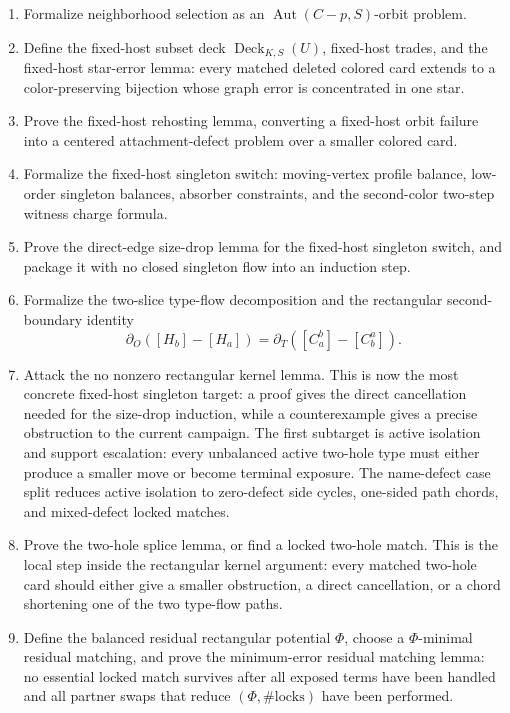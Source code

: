 \documentclass[11pt]{article}
\newcommand{\Deck}{\operatorname{Deck}}
\newcommand{\Aut}{\operatorname{Aut}}
\begin{document}
\begin{enumerate}[leftmargin=2em]
  \item Formalize neighborhood selection as an \(\Aut(C-p,S)\)-orbit problem.

  \item Define the fixed-host subset deck
  \(\Deck_{K,S}(U)\), fixed-host trades, and the fixed-host star-error
  lemma: every matched deleted colored card extends to a color-preserving
  bijection whose graph error is concentrated in one star.

  \item Prove the fixed-host rehosting lemma, converting a fixed-host orbit
  failure into a centered attachment-defect problem over a smaller colored
  card.

  \item Formalize the fixed-host singleton switch: moving-vertex profile
  balance, low-order singleton balances, absorber constraints, and the
  second-color two-step witness charge formula.

  \item Prove the direct-edge size-drop lemma for the fixed-host singleton
  switch, and package it with no closed singleton flow into an induction step.

  \item Formalize the two-slice type-flow decomposition and the rectangular
  second-boundary identity
  \[
    \partial_O([H_b]-[H_a])
    =
    \partial_T([C_a^b]-[C_b^a]).
  \]

  \item Attack the no nonzero rectangular kernel lemma.  This is now the
  most concrete fixed-host singleton target: a proof gives the direct
  cancellation needed for the size-drop induction, while a counterexample
  gives a precise obstruction to the current campaign.  The first subtarget is
  active isolation and support escalation: every unbalanced active two-hole
  type must either produce a smaller move or become terminal exposure.  The
  name-defect case split reduces active isolation to zero-defect side cycles,
  one-sided path chords, and mixed-defect locked matches.

  \item Prove the two-hole splice lemma, or find a locked two-hole match.
  This is the local step inside the rectangular kernel argument: every
  matched two-hole card should either give a smaller obstruction, a direct
  cancellation, or a chord shortening one of the two type-flow paths.

  \item Define the balanced residual rectangular potential \(\Phi\), choose a
  \(\Phi\)-minimal residual matching, and prove the minimum-error residual
  matching lemma: no essential locked match survives after all exposed terms
  have been handled and all partner swaps that reduce
  \((\Phi,\#\text{locks})\) have been performed.


\end{enumerate}
\end{document}
